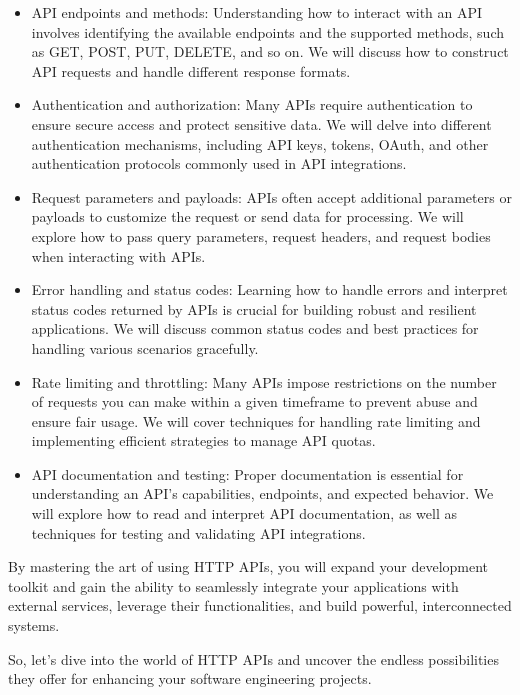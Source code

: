 \begin{itemize}
\item API endpoints and methods: Understanding how to interact with an
  API involves identifying the available endpoints and the supported
  methods, such as GET, POST, PUT, DELETE, and so on. We will discuss how to
  construct API requests and handle different response formats.

\item Authentication and authorization: Many APIs require
  authentication to ensure secure access and protect sensitive
  data. We will delve into different authentication mechanisms,
  including API keys, tokens, OAuth, and other authentication
  protocols commonly used in API integrations.

\item Request parameters and payloads: APIs often accept additional
  parameters or payloads to customize the request or send data for
  processing. We will explore how to pass query parameters, request
  headers, and request bodies when interacting with APIs.

\item Error handling and status codes: Learning how to handle errors
  and interpret status codes returned by APIs is crucial for building
  robust and resilient applications. We will discuss common status
  codes and best practices for handling various scenarios gracefully.

\item Rate limiting and throttling: Many APIs impose restrictions on
  the number of requests you can make within a given timeframe to
  prevent abuse and ensure fair usage. We will cover techniques for
  handling rate limiting and implementing efficient strategies to
  manage API quotas.

\item API documentation and testing: Proper documentation is essential
  for understanding an API's capabilities, endpoints, and expected
  behavior. We will explore how to read and interpret API
  documentation, as well as techniques for testing and validating API
  integrations.
\end{itemize}

By mastering the art of using HTTP APIs, you will expand your
development toolkit and gain the ability to seamlessly integrate your
applications with external services, leverage their functionalities,
and build powerful, interconnected systems.

So, let's dive into the world of HTTP APIs and uncover the endless
possibilities they offer for enhancing your software engineering
projects.
